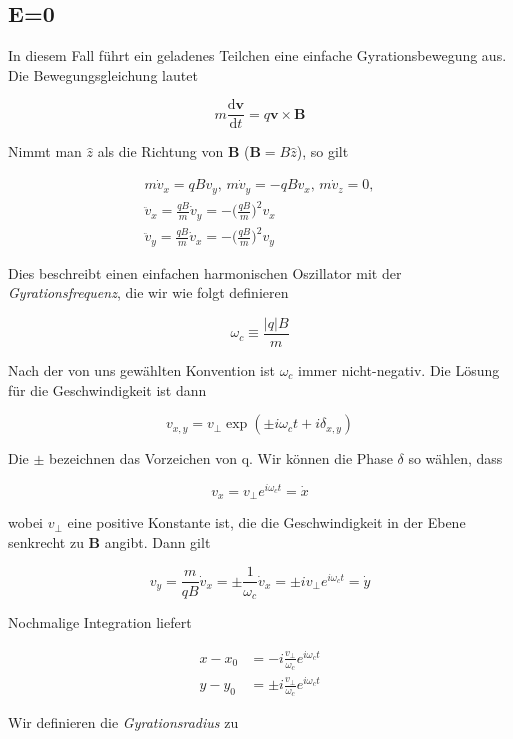 \documentclass[
  a4paper,
  DIV=11]{scrreprt}
\begin{document}
\hypertarget{e0}{%
\subsection{E=0}\label{e0}}

In diesem Fall führt ein geladenes Teilchen eine einfache
Gyrationsbewegung aus. Die Bewegungsgleichung lautet

\[
m\frac{\mathrm d\mathbf{v}}{\mathrm dt} = q\mathbf{v}\times\mathbf{B}
\]

Nimmt man \(\widehat{z}\) als die Richtung von \(\mathbf{B}\)
(\(\mathbf{B} = B\widehat{z}\)), so gilt

\[
\begin{aligned}
m\dot{v}_x = qB v_y,\, m\dot{v}_y = -qB v_x,\, m\dot{v}_z = 0, \\
\ddot{v}_x = \frac{qB}{m}\dot{v}_y = -\big( \frac{qB}{m}\big)^2 v_x \\
\ddot{v}_y = \frac{qB}{m}\dot{v}_x = -\big( \frac{qB}{m}\big)^2 v_y
\end{aligned}
\]

Dies beschreibt einen einfachen harmonischen Oszillator mit der
\emph{Gyrationsfrequenz}, die wir wie folgt definieren

\[
\omega_c \equiv \frac{| q | B}{m}
\]

Nach der von uns gewählten Konvention ist \(\omega_c\) immer
nicht-negativ. Die Lösung für die Geschwindigkeit ist dann

\[
v_{x,y} = v_\perp \exp(\pm i \omega_c t + i\delta_{x,y})
\]

Die \(\pm\) bezeichnen das Vorzeichen von q. Wir können die Phase
\(\delta\) so wählen, dass

\[
v_x = v_\perp e^{i\omega_c t} = \dot{x}
\]

wobei \(v_\perp\) eine positive Konstante ist, die die Geschwindigkeit
in der Ebene senkrecht zu \(\mathbf{B}\) angibt. Dann gilt

\[
v_y  = \frac{m}{qB} \dot{v}_x = \pm \frac{1}{\omega_c}\dot{v}_x = \pm i v_\perp e^{i\omega_c t} = \dot{y}
\]

Nochmalige Integration liefert

\[
\begin{aligned}
x - x_0 &= -i\frac{v_\perp}{\omega_c}e^{i\omega_c t} \\
y - y_0 &= \pm i\frac{v_\perp}{\omega_c}e^{i\omega_c t}
\end{aligned}
\]

Wir definieren die \emph{Gyrationsradius} zu
\end{document}
